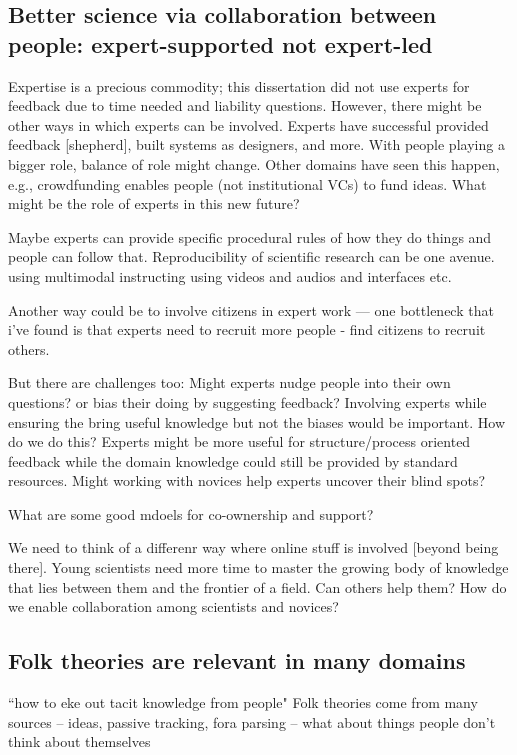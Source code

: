 \subsection{Better science via collaboration between people: expert-supported not expert-led}
Expertise is a precious commodity; this dissertation did not use experts for feedback due to time needed and liability questions. However, there might be other ways in which experts can be involved. Experts have successful provided feedback [shepherd], built systems as designers, and more. With people playing a bigger role, balance of role might change. Other domains have seen this happen, e.g., crowdfunding enables people (not institutional VCs) to fund ideas. What might be the role of experts in this new future?



 Maybe experts can provide specific procedural rules of how they do things and people can follow that. Reproducibility of scientific research can be one avenue. using multimodal instructing using videos and audios and interfaces etc. 

Another way could be to involve citizens in expert work — one bottleneck that i’ve found is that experts need to recruit more people - find citizens to recruit others. 

But there are challenges too: Might experts nudge people into their own questions? or bias their doing by suggesting feedback?
    Involving experts while ensuring the bring useful knowledge but not the biases would be important. How do we do this? Experts might be more useful for structure/process oriented feedback while the domain knowledge could still be provided by standard resources. Might working with novices help experts uncover their blind spots?

What are some good mdoels for co-ownership and support?



We need to think of a differenr way where online stuff is involved [beyond being there]. Young scientists need more time to master the growing body of knowledge that lies between them and the frontier of a field. Can others help them? How do we enable collaboration among scientists and novices?



\subsection{Folk theories are relevant in many domains}
“how to eke out tacit knowledge from people"
Folk theories come from many sources -- ideas, passive tracking, fora parsing
-- what about things people don't think about themselves

